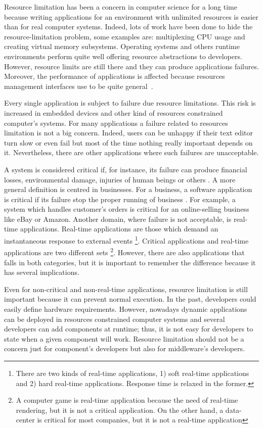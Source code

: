 Resource limitation has been a concern in computer science for a long time because writing applications for an environment with unlimited resources is easier than for real computer systems.
Indeed, lots of work have been done to hide the resource-limitation problem, some examples are: multiplexing CPU usage and creating virtual memory subsystems.
Operating systems and others runtime environments perform quite well offering resource abstractions to developers.
However, resource limits are still there and they can produce applications failures. Moreover, the performance of applications is affected because resources management interfaces use to be quite general~\cite{Engler:1995:EOS:224056.224076}.

Every single application is subject to failure due resource limitations. This risk is increased in embedded devices and other kind of resources constrained computer's systems. For many applications a failure related to resources limitation is not a big concern.
Indeed, users can be unhappy if their text editor turn slow or even fail but most of the time nothing really important depends on it.
Nevertheless, there are other applications where such failures are unacceptable.

A system is considered critical if, for instance, its failure can produce financial losses, environmental damage, injuries of human beings or others  \cite{Knight:2002:SCS:581339.581406}.
A more general definition is centred in businesses.
For a business, a software application is critical if its failure stop the proper running of business \cite{Knight:2002:SCS:581339.581406}.
For example, a system which handles customer's orders is critical for an online-selling business like eBay or Amazon.
Another domain, where failure is not acceptable, is real-time applications.
Real-time applications are those which demand an instantaneous response to external events \footnote{There are two kinds of real-time applications, 1) soft real-time applications and 2) hard real-time applications. Response time is relaxed in the former.}.
Critical applications and real-time applications are two different sets \footnote{A computer game is real-time application because the need of real-time rendering, but it is not a critical application. On the other hand, a data-center is critical for most companies, but it is not a real-time application}.
However, there are also applications that falls in both categories, but it is important to remember the difference because it has several implications.

Even for non-critical and non-real-time applications, resource limitation is still important because it can prevent normal execution.
In the past, developers could easily define hardware requirements.
However, nowadays dynamic applications can be deployed in resources constrained computer systems and several developers can add components at runtime; thus, it is not easy for developers to state when a given component will work.
Resource limitation should not be a concern just for component's developers but also for middleware's developers.

